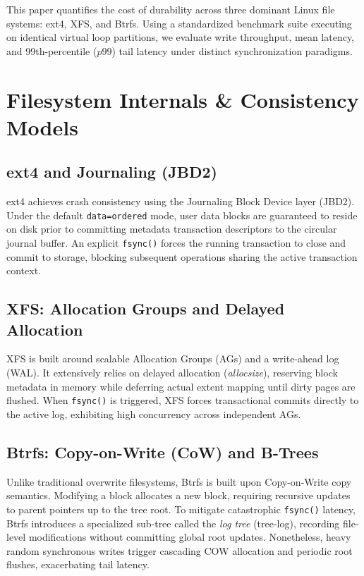 \documentclass[conference]{IEEEtran}
\begin{document}
This paper quantifies the cost of durability across three dominant Linux file systems: ext4, XFS, and Btrfs. Using a standardized benchmark suite executing on identical virtual loop partitions, we evaluate write throughput, mean latency, and 99th-percentile ($p99$) tail latency under distinct synchronization paradigms.

\section{Filesystem Internals \& Consistency Models}
\subsection{ext4 and Journaling (JBD2)}
ext4 achieves crash consistency using the Journaling Block Device layer (JBD2). Under the default \texttt{data=ordered} mode, user data blocks are guaranteed to reside on disk prior to committing metadata transaction descriptors to the circular journal buffer. An explicit \texttt{fsync()} forces the running transaction to close and commit to storage, blocking subsequent operations sharing the active transaction context.

\subsection{XFS: Allocation Groups and Delayed Allocation}
XFS is built around scalable Allocation Groups (AGs) and a write-ahead log (WAL). It extensively relies on delayed allocation (\textit{allocsize}), reserving block metadata in memory while deferring actual extent mapping until dirty pages are flushed. When \texttt{fsync()} is triggered, XFS forces transactional commits directly to the active log, exhibiting high concurrency across independent AGs.

\subsection{Btrfs: Copy-on-Write (CoW) and B-Trees}
Unlike traditional overwrite filesystems, Btrfs is built upon Copy-on-Write copy semantics. Modifying a block allocates a new block, requiring recursive updates to parent pointers up to the tree root. To mitigate catastrophic \texttt{fsync()} latency, Btrfs introduces a specialized sub-tree called the \textit{log tree} (tree-log), recording file-level modifications without committing global root updates. Nonetheless, heavy random synchronous writes trigger cascading COW allocation and periodic root flushes, exacerbating tail latency.
\end{document}
